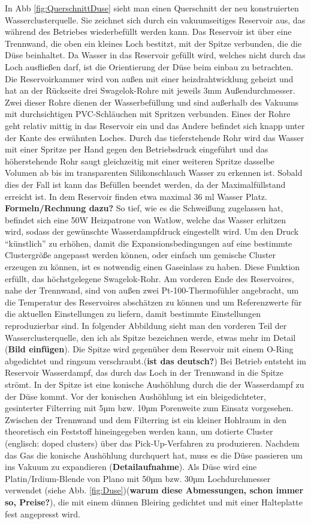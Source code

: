 In Abb \ref{fig:QuerschnittDuse} sieht man einen Querschnitt der neu konstruierten Wasserclusterquelle. Sie zeichnet sich durch ein vakuumseitiges Reservoir aus, das während des Betriebes wiederbefüllt werden kann. Das Reservoir ist über eine Trennwand, die oben ein kleines Loch bestitzt, mit der Spitze verbunden, die die Düse beinhaltet. Da Wasser in das Reservoir gefüllt wird, welches nicht durch das Loch ausfließen darf, ist die Orientierung der Düse beim einbau zu betrachten. Die Reservoirkammer wird von außen mit einer heizdrahtwicklung geheizt und hat an der Rückseite drei Swagelok-Rohre mit jeweils 3mm Außendurchmesser. Zwei dieser Rohre dienen der Wasserbefüllung und sind außerhalb des Vakuums mit durchsichtigen PVC-Schläuchen mit Spritzen verbunden. Eines der Rohre geht relativ mittig in das Reservoir ein und das Andere befindet sich knapp unter der Kante des erwähnten Loches. Durch das tieferstehende Rohr wird das Wasser mit einer Spritze per Hand gegen den Betriebsdruck eingeführt und das höherstehende Rohr saugt gleichzeitig mit einer weiteren Spritze dasselbe Volumen ab bis im transparenten Silikonschlauch Wasser zu erkennen ist. Sobald dies der Fall ist kann das Befüllen beendet werden, da der Maximalfüllstand erreicht ist. In dem Reservoir finden etwa maximal 36 ml Wasser Platz. \textbf{Formeln/Rechnung dazu?} So tief, wie es die Schweißung zugelassen hat, befindet sich eine 50W Heizpatrone von Watlow, welche das Wasser erhitzen wird, sodass der gewünschte Wasserdampfdruck eingestellt wird. Um den Druck \enquote{künstlich} zu erhöhen, damit die Expansionsbedingungen auf eine bestimmte Clustergröße angepasst werden können, oder einfach um gemische Cluster erzeugen zu können, ist es notwendig einen Gaseinlass zu haben. Diese Funktion erfüllt, das höchstgelegene Swagelok-Rohr. Am vorderen Ende des Reservoires, nahe der Trennwand, sind von außen zwei Pt-100-Thermofühler angebracht, um die Temperatur des Reservoires abschätzen zu können und um Referenzwerte für die aktuellen Einstellungen zu liefern, damit bestimmte Einstellungen reproduzierbar sind. 
In folgender Abbildung sieht man den vorderen Teil der Wasserclusterquelle, den ich als Spitze bezeichnen werde, etwas mehr im Detail (\textbf{Bild einfügen}).  Die Spitze wird gegenüber dem Reservoir mit einem O-Ring abgedichtet und ringsum verschraubt.(\textbf{ist das deutsch?}) Bei Betrieb entsteht im Reservoir Wasserdampf, das durch das Loch in der Trennwand in die Spitze strömt. In der Spitze ist eine konische Aushöhlung durch die der Wasserdampf zu der Düse kommt. Vor der konischen Aushöhlung ist ein bleigedichteter, gesinterter Filterring mit 5µm bzw. 10µm Porenweite zum Einsatz vorgesehen. Zwischen der Trennwand und dem Filterring ist ein kleiner Hohlraum in den theoretisch ein Feststoff hineingegeben werden kann, um dotierte Cluster (englisch: doped clusters) über das Pick-Up-Verfahren zu produzieren. Nachdem das Gas die konische Aushöhlung durchquert hat, muss es die Düse passieren um ins Vakuum zu expandieren (\textbf{Detailaufnahme}). Als Düse wird eine Platin/Irdium-Blende von Plano mit 50µm bzw. 30µm Lochdurchmesser verwendet (siehe Abb. \ref{fig:Duse})(\textbf{warum diese Abmessungen, schon immer so, Preise?}), die mit einem dünnen Bleiring gedichtet und mit einer Halteplatte fest angepresst wird. %
